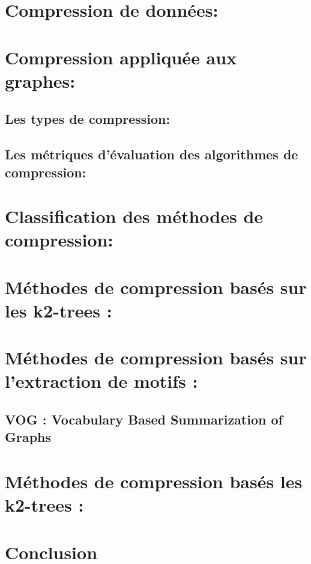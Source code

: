 \section{Compression de données: }
			
		\section{Compression appliquée aux graphes:}
			
			
			\subsection{Les types de compression:}
	
			\subsection{Les métriques d'évaluation des algorithmes de compression:}
			
			\section{Classification des méthodes de compression:}
			
			\section{Méthodes de compression basés sur les k2-trees :}
			
			
			\section{Méthodes de compression basés sur l'extraction de motifs :}
				\subsection{VOG : Vocabulary Based Summarization of Graphs}	
						
		
		
		\section{Méthodes de compression basés les k2-trees :}
						
		\section{Conclusion}